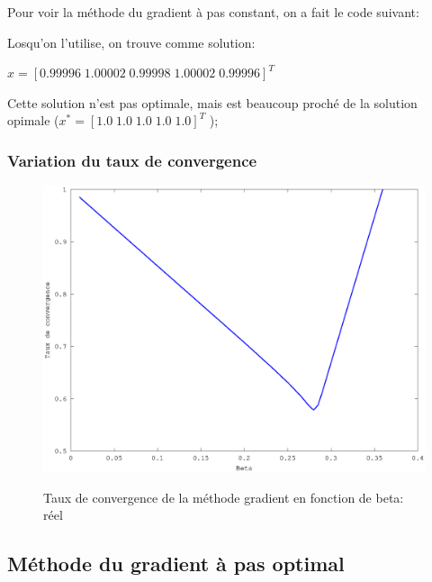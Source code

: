 \documentclass[a4paper,11pt]{article}
\begin{document}
Pour voir la méthode du gradient à pas constant, on a fait le code suivant:

\begin{multicols}{2}
  
\end{multicols}

Losqu'on l'utilise, on trouve comme solution:

\begin{center}
  $x = [ 0.99996 \; 1.00002 \; 0.99998 \; 1.00002 \; 0.99996]^T$
\end{center}

Cette solution n'est pas optimale, mais est beaucoup proché de la solution opimale
($x^* = [ 1.0 \; 1.0 \; 1.0 \; 1.0 \; 1.0]^T$
);

\subsubsection{Variation du taux de convergence}

\begin{figure}[h!]
  \begin{centering}
    \includegraphics[scale=0.5]{../grad_beta}
    \label{rspro2}
    \par\end{centering}
  \caption{Taux de convergence de la méthode gradient en fonction de beta: réel}
  \label{fig:jacobi-conv}
\end{figure}

\newpage
\subsection{Méthode du gradient à pas optimal}
\end{document}
